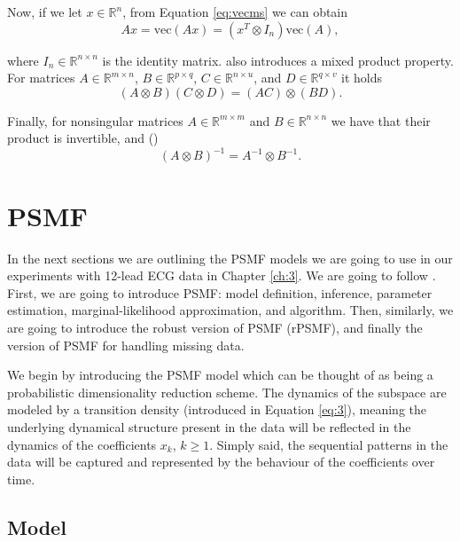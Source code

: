 \documentclass{mldsmsc}
\begin{document}
\noindent Now, if we let $x \in \mathbb{R}^n$, from Equation \ref{eq:vecms} we can obtain
\begin{equation}
    Ax = \text{vec}(Ax) = (x^T \otimes I_n)\text{vec}(A),
\end{equation}

\noindent where $I_n \in \mathbb{R}^{n \times n}$ is the identity matrix. \cite{alma993596394401591} also introduces a mixed product property. For matrices $A \in \mathbb{R}^{m \times n}$, $B \in \mathbb{R}^{p \times q}$, $C \in \mathbb{R}^{n \times u}$, and $D \in \mathbb{R}^{q \times v}$ it holds 
\begin{equation}
    (A \otimes B)(C \otimes D) = (AC) \otimes (BD).
\end{equation}

\noindent Finally, for nonsingular matrices $A \in \mathbb{R}^{m \times m}$ and $B \in \mathbb{R}^{n \times n}$ we have that their product is invertible, and (\cite{alma993596394401591})
\begin{equation}
    (A \otimes B)^{-1} = A^{-1} \otimes B^{-1}.
\end{equation}

\section{PSMF}

\noindent In the next sections we are outlining the PSMF models we are going to use in our experiments with 12-lead ECG data in Chapter \ref{ch:3}. We are going to follow \cite{akyildiz2021probabilistic}. First, we are going to introduce PSMF: model definition, inference, parameter estimation, marginal-likelihood approximation, and algorithm. Then, similarly, we are going to introduce the robust version of PSMF (rPSMF), and finally the version of PSMF for handling missing data. \newline

\noindent We begin by introducing the PSMF model which can be thought of as being a probabilistic dimensionality reduction scheme. The dynamics of the subspace are modeled by a transition density (introduced in Equation \ref{eq:3}), meaning the underlying dynamical structure present in the data will be reflected in the dynamics of the coefficients $x_k$, $k \geq 1$. Simply said, the sequential patterns in the data will be captured and represented by the behaviour of the coefficients over time.

\subsection{Model}
\end{document}
